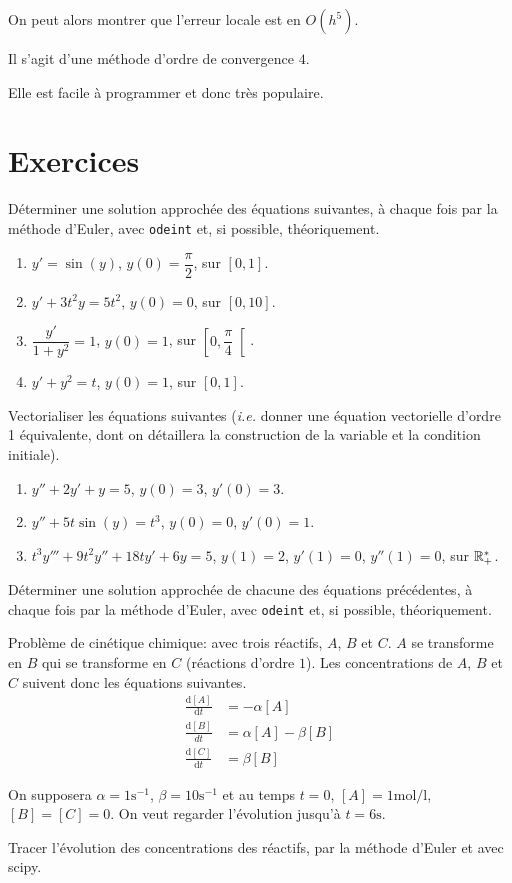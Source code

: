 On peut alors montrer que l'erreur locale est en $O(h^{5})$.

Il s'agit d'une méthode d'ordre de convergence $4$.

Elle est facile à programmer et donc très populaire.

\section{Exercices}

  Déterminer une solution approchée des équations suivantes, à chaque fois par la méthode d'Euler, avec \texttt{odeint} et, si possible, théoriquement.
  \begin{enumerate}
    \item $y' = \sin(y)$, $y(0) = \dfrac{\pi}{2}$, sur $[0,1]$.
    \item $y' + 3t^2 y = 5t^2$, $y(0) = 0$, sur $[0,10]$.
    \item $\dfrac{y'}{1+y^2} = 1$, $y(0) = 1$, sur $\left[0,\dfrac{\pi}{4} \right[$.
    \item $y'+y^2=t$, $y(0) = 1$, sur $[0,1]$.
  \end{enumerate}

  Vectorialiser les équations suivantes (\emph{i.e.} donner une équation vectorielle d'ordre 1 équivalente, dont on détaillera la construction de la variable et la condition initiale).
  \begin{enumerate}
    \item $y'' + 2y' + y = 5$, $y(0) = 3$, $y'(0) = 3$.
    \item $y'' + 5t \sin(y) = t^3$, $y(0) = 0$, $y'(0) = 1$.
    \item $t^3y''' + 9t^2y'' + 18ty' + 6y = 5$, $y(1) = 2$, $y'(1) = 0$, $y''(1) = 0$, sur $\mathbb{R}_+^\ast$.  
  \end{enumerate}

  Déterminer une solution approchée de chacune des équations précédentes, à chaque fois par la méthode d'Euler, avec \texttt{odeint} et, si possible, théoriquement.

   Problème de cinétique chimique: avec trois réactifs, $A$, $B$ et
$C$. $A$ se transforme en $B$ qui se transforme en $C$ (réactions d'ordre $1$). 
Les concentrations de $A$, $B$ et $C$ suivent donc les équations suivantes.
\begin{align*}
  \frac{\mathrm{d}[A]}{\mathrm{d}t}&=-\alpha[A]\\
\frac{\mathrm{d}[B]}{dt}&=\alpha[A]-\beta[B]\\
\frac{\mathrm{d}[C]}{\mathrm{d}t}&=\beta[B]
\end{align*}

On supposera $\alpha=1\text{s}^{-1}$, $\beta=10\text{s}^{-1}$ et au
temps $t=0$, $[A] = 1\text{mol}/\text{l}$, $[B]=[C]=0$. On veut
regarder l'évolution
jusqu'à $t=6\text{s}$.

Tracer l'évolution des concentrations des réactifs, par la méthode d'Euler et avec scipy.
%
